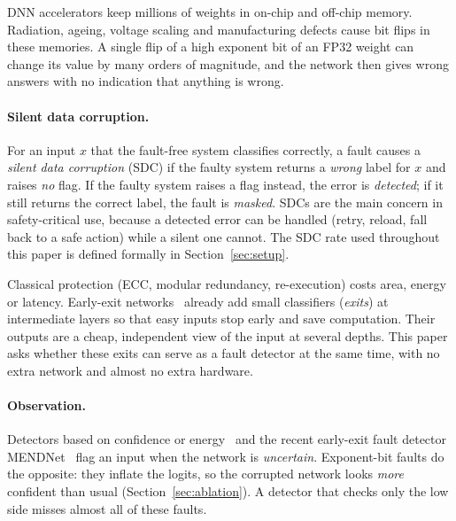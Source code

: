 \documentclass[10pt,a4paper]{article}
\begin{document}
DNN accelerators keep millions of weights in on-chip and off-chip memory. Radiation, ageing, voltage
scaling and manufacturing defects cause bit flips in these memories. A single flip of a high exponent bit
of an FP32 weight can change its value by many orders of magnitude, and the network then gives wrong
answers with no indication that anything is wrong.

\paragraph{Silent data corruption.} For an input $x$ that the fault-free system classifies correctly, a
fault causes a \emph{silent data corruption} (SDC) if the faulty system returns a \emph{wrong} label for $x$
and raises \emph{no} flag. If the faulty system raises a flag instead, the error is \emph{detected}; if it
still returns the correct label, the fault is \emph{masked}. SDCs are the main concern in safety-critical
use, because a detected error can be handled (retry, reload, fall back to a safe action) while a silent one
cannot. The SDC rate used throughout this paper is defined formally in Section~\ref{sec:setup}.

Classical protection (ECC, modular redundancy, re-execution) costs area, energy or latency. Early-exit
networks~\cite{branchynet,sdn} already add small classifiers (\emph{exits}) at intermediate layers so that
easy inputs stop early and save computation. Their outputs are a cheap, independent view of the input at
several depths. This paper asks whether these exits can serve as a fault detector at the same time, with
no extra network and almost no extra hardware.

\paragraph{Observation.} Detectors based on confidence or energy~\cite{msp,energy} and the recent
early-exit fault detector MENDNet~\cite{mendnet} flag an input when the network is \emph{uncertain}.
Exponent-bit faults do the opposite: they inflate the logits, so the corrupted network looks
\emph{more} confident than usual (Section~\ref{sec:ablation}). A detector that checks only the low side
misses almost all of these faults.
\end{document}
